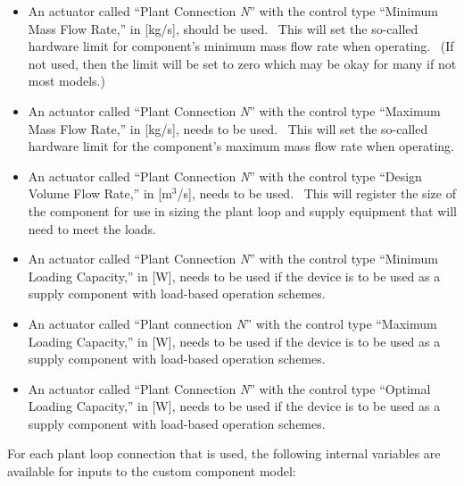 \begin{itemize}
\item
  An actuator called ``Plant Connection \emph{N}'' with the control type ``Minimum Mass Flow Rate,'' in {[}kg/s{]}, should be used.~ This will set the so-called hardware limit for component's minimum mass flow rate when operating.~ (If not used, then the limit will be set to zero which may be okay for many if not most models.)
\item
  An actuator called ``Plant Connection \emph{N}'' with the control type ``Maximum Mass Flow Rate,'' in {[}kg/s{]}, needs to be used.~ This will set the so-called hardware limit for the component's maximum mass flow rate when operating.
\item
  An actuator called ``Plant Connection \emph{N}'' with the control type ``Design Volume Flow Rate,'' in {[}m\(^{3}\)/s{]}, needs to be used.~ This will register the size of the component for use in sizing the plant loop and supply equipment that will need to meet the loads.
\item
  An actuator called ``Plant Connection \emph{N}'' with the control type ``Minimum Loading Capacity,'' in {[}W{]}, needs to be used if the device is to be used as a supply component with load-based operation schemes.
\item
  An actuator called ``Plant connection \emph{N}'' with the control type ``Maximum Loading Capacity,'' in {[}W{]}, needs to be used if the device is to be used as a supply component with load-based operation schemes.
\item
  An actuator called ``Plant Connection \emph{N}'' with the control type ``Optimal Loading Capacity,'' in {[}W{]}, needs to be used if the device is to be used as a supply component with load-based operation schemes.
\end{itemize}

For each plant loop connection that is used, the following internal variables are available for inputs to the custom component model:

